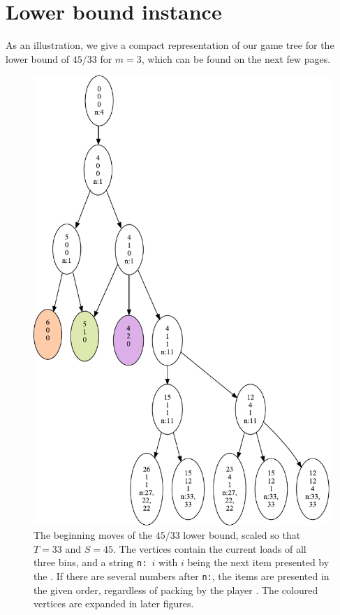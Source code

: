 \newpage
\section{Lower bound instance}\label{sec:4:instance}

As an illustration, we give a compact representation of our game tree
for the lower bound of $45/33$ for $m=3$, which can be found on the
next few pages.


\begin{figure}[H]
  \centering
  \includegraphics[scale=0.65]{img/big_picture.pdf}
  \caption[The initial items of the $45/33$ lower bound.]{The beginning moves of the $45/33$ lower bound, scaled so
      that $T = 33$ and $S = 45$. The vertices contain the current
      loads of all three bins, and a string \texttt{n: $i$} with $i$
      being the next item presented by the \adversary. If there are
      several numbers after \texttt{n:}, the items are presented in
      the given order, regardless of packing by the player \algo. The coloured vertices are expanded in later figures.}
\end{figure}

